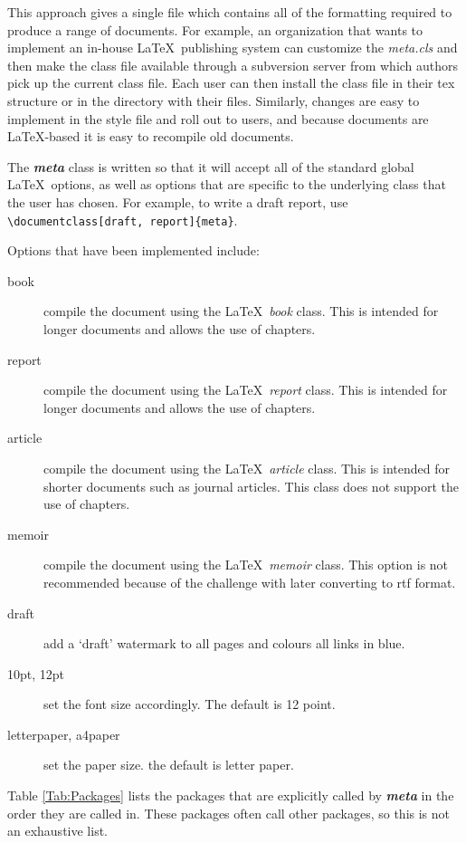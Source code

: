 \documentclass[12pt,letterpaper]{article}
\newcommand{\fn}[1]{\emph{#1}}
\newcommand{\packagename}[1]{\textbf{\emph{#1}}}
\begin{document}
This approach gives a single file which contains all of the formatting required to produce a range of documents. For example, an organization that wants to implement an in-house \LaTeX\ publishing system can customize the \fn{meta.cls} and then make the class file available through a subversion server from which authors pick up the current class file. Each user can then install the class file in their tex structure or in the directory with their files. Similarly, changes are easy to implement in the style file and roll out to users, and because documents are \LaTeX-based it is easy to recompile old documents.

The \packagename{meta} class is written so that it will accept all of the standard global \LaTeX\ options, as well as options that are specific to the underlying class that the user has chosen. For example, to write a draft report, use \verb+\documentclass[draft, report]{meta}+.

Options that have been implemented include:
\begin{description}
\item[book]{compile the document using the \LaTeX\ \emph{book} class. This is intended for longer documents and allows the use of chapters.}
\item[report]{compile the document using the \LaTeX\ \emph{report} class. This is intended for longer documents and allows the use of chapters.}
\item[article]{compile the document using the \LaTeX\ \emph{article} class. This is intended for shorter documents such as journal articles. This class does not support the use of chapters.}
\item[memoir]{compile the document using the \LaTeX\ \emph{memoir} class. This option is not recommended because of the challenge with later converting to rtf format.}
\item[draft]{add a `draft' watermark to all pages and colours all links in blue.}
\item[10pt, 12pt]{set the font size accordingly. The default is 12 point.}
\item[letterpaper, a4paper]{set the paper size. the default is letter paper.}
\end{description}

Table \ref{Tab:Packages} lists the packages that are explicitly called by \packagename{meta} in the order they are called in. These packages often call other packages, so this is not an exhaustive list.
\end{document}

